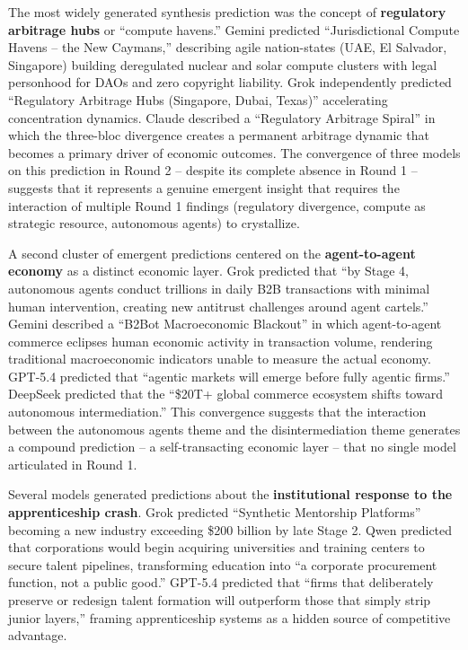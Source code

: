 \documentclass[preprint,review,12pt]{elsarticle}
\begin{document}
The most widely generated synthesis prediction was the concept of \textbf{regulatory arbitrage hubs} or ``compute havens.'' Gemini predicted ``Jurisdictional Compute Havens -- the New Caymans,'' describing agile nation-states (UAE, El Salvador, Singapore) building deregulated nuclear and solar compute clusters with legal personhood for DAOs and zero copyright liability. Grok independently predicted ``Regulatory Arbitrage Hubs (Singapore, Dubai, Texas)'' accelerating concentration dynamics. Claude described a ``Regulatory Arbitrage Spiral'' in which the three-bloc divergence creates a permanent arbitrage dynamic that becomes a primary driver of economic outcomes. The convergence of three models on this prediction in Round 2 -- despite its complete absence in Round 1 -- suggests that it represents a genuine emergent insight that requires the interaction of multiple Round 1 findings (regulatory divergence, compute as strategic resource, autonomous agents) to crystallize.

A second cluster of emergent predictions centered on the \textbf{agent-to-agent economy} as a distinct economic layer. Grok predicted that ``by Stage 4, autonomous agents conduct trillions in daily B2B transactions with minimal human intervention, creating new antitrust challenges around agent cartels.'' Gemini described a ``B2Bot Macroeconomic Blackout'' in which agent-to-agent commerce eclipses human economic activity in transaction volume, rendering traditional macroeconomic indicators unable to measure the actual economy. GPT-5.4 predicted that ``agentic markets will emerge before fully agentic firms.'' DeepSeek predicted that the ``\$20T+ global commerce ecosystem shifts toward autonomous intermediation.'' This convergence suggests that the interaction between the autonomous agents theme and the disintermediation theme generates a compound prediction -- a self-transacting economic layer -- that no single model articulated in Round 1.

Several models generated predictions about the \textbf{institutional response to the apprenticeship crash}. Grok predicted ``Synthetic Mentorship Platforms'' becoming a new industry exceeding \$200 billion by late Stage 2. Qwen predicted that corporations would begin acquiring universities and training centers to secure talent pipelines, transforming education into ``a corporate procurement function, not a public good.'' GPT-5.4 predicted that ``firms that deliberately preserve or redesign talent formation will outperform those that simply strip junior layers,'' framing apprenticeship systems as a hidden source of competitive advantage.
\end{document}
